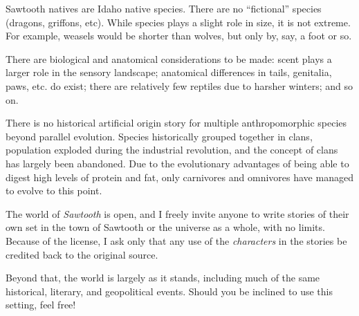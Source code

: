 Sawtooth natives are Idaho native species. There are no ``fictional'' species (dragons, griffons, etc). While species plays a slight role in size, it is not extreme. For example, weasels would be shorter than wolves, but only by, say, a foot or so.

There are biological and anatomical considerations to be made: scent plays a larger role in the sensory landscape; anatomical differences in tails, genitalia, paws, etc. do exist; there are relatively few reptiles due to harsher winters; and so on.

There is no historical artificial origin story for multiple anthropomorphic species beyond parallel evolution. Species historically grouped together in clans, population exploded during the industrial revolution, and the concept of clans has largely been abandoned. Due to the evolutionary advantages of being able to digest high levels of protein and fat, only carnivores and omnivores have managed to evolve to this point.

The world of \emph{Sawtooth} is open, and I freely invite anyone to write stories of their own set in the town of Sawtooth or the universe as a whole, with no limits. Because of the license, I ask only that any use of the \emph{characters} in the stories be credited back to the original source.

Beyond that, the world is largely as it stands, including much of the same historical, literary, and geopolitical events. Should you be inclined to use this setting, feel free!

\chapter*{}

